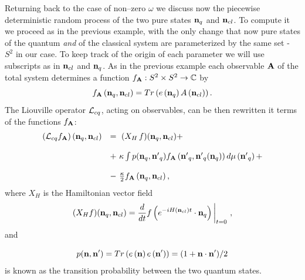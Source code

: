 \documentclass[12pt]{article}
\def\complex{{\mathbb C}}
\def\be{\begin{equation}} \def\ee{\end{equation}}
\begin{document}
Returning back to the case of non--zero $\omega$ we discuss now
the piecewise deterministic random process
of the two pure states ${\bf n}_q$ and
${\bf n}_{cl}$.  To compute it we proceed as in the previous example, 
with the
only change that now pure states of the quantum {\em and} of the classical
system are parameterized by the same set - $S^2$ in our case.  To keep track of
the origin of each parameter we will use subscripts as in ${\bf n}_{cl}$ and
${\bf n}_{q}$.  As in the previous example each observable ${\bf A}$ of the
total
system determines a function $f_{\bf A}: S^2\times S^2\rightarrow\complex$ by
$$f_{\bf A}\left ({\bf n}_q, {\bf n}_{cl}\right)=Tr\left (e\left ({\bf
n}_q\right)A\left ({\bf n}_{cl}\right)\right). $$ 
The Liouville operator  ${\cal L}_{cq}$,  acting on observables,   can be then  
rewritten it terms of the functions  $f_{\bf A}$: 
 \be
 \begin{array}{ll}
\left ({\cal L}_{cq}f_{\bf A}\right)\left ({\bf n}_q, {\bf n}_{cl}\right)
& 
= \   (X_H\,  f) ({\bf n}_q, {\bf n}_{cl})  +
\cr\cr
& + \  \kappa\int p ({\bf n}_q, {\bf n'}_{q}) f_{\bf A}\left ({\bf n'}_{q}, 
{{\bf n'}_{q}} ({\bf n}_{q})\right)d\mu \left ({\bf n'}_{q}\right) +
\cr\cr
& - \ {\kappa\over 2} f_{\bf A}\left ({\bf n}_q, {\bf n}_{cl}\right), 
\end{array}
\ee
where $X_H$ is the Hamiltonian vector field
\be
 (X_H f) ({\bf n}_q, {\bf n}_{cl})={d\over dt}f\left (e^{-iH ({\bf n}_{cl})t}
\cdot {\bf n}_{q}
\right)\bigg\vert_{t=0} \  , 
\ee
and

\be
 p ({\bf n}, {\bf n'}) = Tr\left (e\left ({\bf n}\right)e\left ({\bf
n'}\right)\right)= (1+{\bf n\cdot n'})/2
\ee
is known as the transition probability between the two quantum states.
\end{document}
